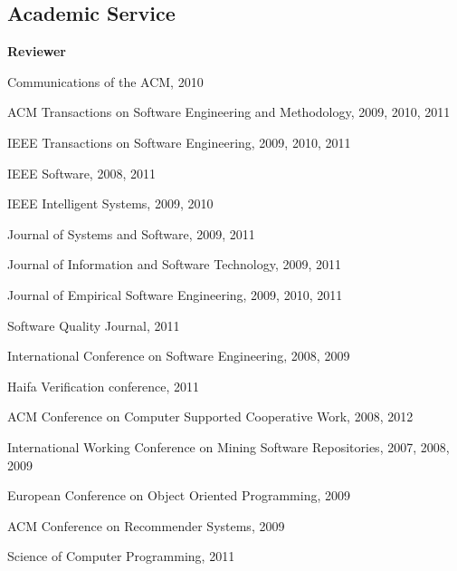 \documentclass[margin,line,article,letterpaper]{res}
\newenvironment{list1}{
  \begin{list}{}{%
      \setlength{\itemsep}{0in}
      \setlength{\parsep}{0in} \setlength{\parskip}{0in}
      \setlength{\topsep}{0in} \setlength{\partopsep}{0in} 
      \setlength{\leftmargin}{0.17in}}}{\end{list}}
\begin{document}
\begin{resume}
\section{Academic \hspace{.2in} Service}
\textbf{Reviewer}
\begin{list1}
\item Communications of the ACM, 2010
\item ACM Transactions on Software Engineering and Methodology, 2009, 2010, 2011
\item IEEE Transactions on Software Engineering, 2009, 2010, 2011
\item IEEE Software, 2008, 2011
\item IEEE Intelligent Systems, 2009, 2010
\item Journal of Systems and Software, 2009, 2011
\item Journal of Information and Software Technology, 2009, 2011
\item Journal of Empirical Software Engineering, 2009, 2010, 2011
\item Software Quality Journal, 2011
\item International Conference on Software Engineering, 2008, 2009
\item Haifa Verification conference, 2011
\item ACM Conference on Computer Supported Cooperative Work, 2008, 2012
\item International Working Conference on Mining Software Repositories, 2007, 2008, 2009
\item European Conference on Object Oriented Programming, 2009
\item ACM Conference on Recommender Systems, 2009
\item Science of Computer Programming, 2011
\end{list1}


\end{resume}
\end{document}
